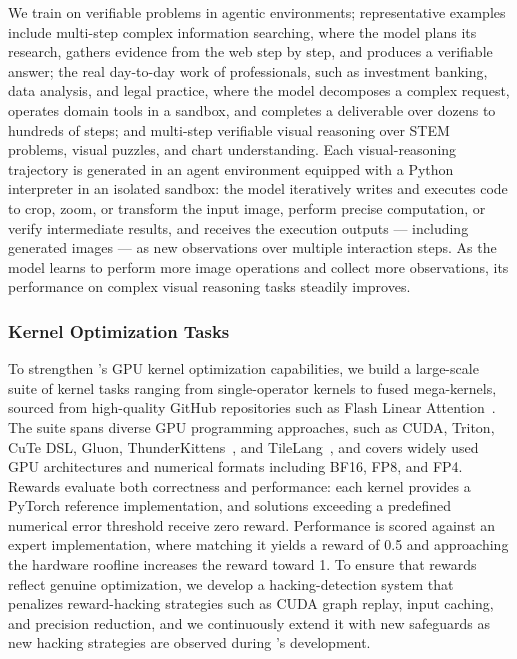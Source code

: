 We train  on verifiable problems in agentic environments; representative examples include multi-step complex information searching, where the model plans its research, gathers evidence from the web step by step, and produces a verifiable answer; the real day-to-day work of professionals, such as investment banking, data analysis, and legal practice, where the model decomposes a complex request, operates domain tools in a sandbox, and completes a deliverable over dozens to hundreds of steps; and multi-step verifiable visual reasoning over STEM problems, visual puzzles, and chart understanding. Each visual-reasoning trajectory is generated in an agent environment equipped with a Python interpreter in an isolated sandbox: the model iteratively writes and executes code to crop, zoom, or transform the input image, perform precise computation, or verify intermediate results, and receives the execution outputs --- including generated images --- as new observations over multiple interaction steps. As the model learns to perform more image operations and collect more observations, its performance on complex visual reasoning tasks steadily improves.


\subsubsection{Kernel Optimization Tasks}
\label{sec:post-envs-kernel}

To strengthen 's GPU kernel optimization capabilities, we build a large-scale suite of kernel tasks ranging from single-operator kernels to fused mega-kernels, sourced from high-quality GitHub repositories such as Flash Linear Attention~\cite{yang2024fla}. The suite spans diverse GPU programming approaches, such as CUDA, Triton, CuTe DSL, Gluon, ThunderKittens~\cite{spector2025thunderkittens}, and TileLang~\cite{wang2025tilelang}, and covers widely used GPU architectures and numerical formats including BF16, FP8, and FP4. Rewards evaluate both correctness and performance: each kernel provides a PyTorch reference implementation, and solutions exceeding a predefined numerical error threshold receive zero reward. Performance is scored against an expert implementation, where matching it yields a reward of 0.5 and approaching the hardware roofline increases the reward toward 1. To ensure that rewards reflect genuine optimization, we develop a hacking-detection system that penalizes reward-hacking strategies such as CUDA graph replay, input caching, and precision reduction, and we continuously extend it with new safeguards as new hacking strategies are observed during 's development.

